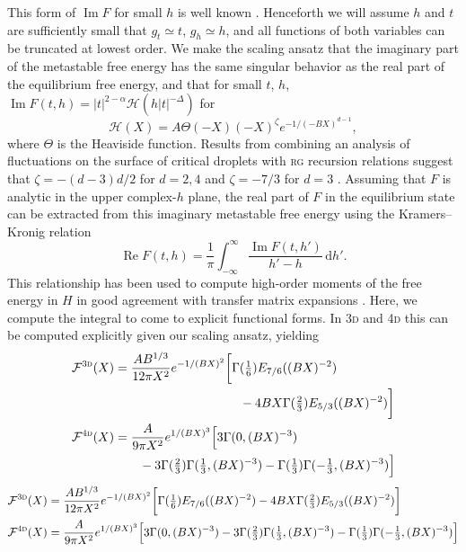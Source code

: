 \documentclass[aps,prl,reprint]{revtex4-1}
\def\[{\begin{equation}}
\def\]{\end{equation}}
\def\re{\mathop{\mathrm{Re}}\nolimits}
\def\im{\mathop{\mathrm{Im}}\nolimits}
\def\dd{\mathrm d}
\newif\ifreprint
\begin{document}
This form of $\im F$ for small $h$ is well known
\cite{langer.1967.condensation,harris.1984.metastability}. Henceforth we will
assume $h$ and $t$ are sufficiently small that $g_t\simeq t$, $g_h\simeq h$,
and all functions of both variables can be truncated at lowest order. We make
the scaling ansatz that the imaginary part of the metastable free energy has
the same singular behavior as the real part of the equilibrium free energy,
and that for small $t$, $h$, $\im F(t,h)=|t|^{2-\alpha}\mathcal
H(h|t|^{-\Delta})$ for
\[
  \mathcal H(X)=A\Theta(-X)(-X)^\zeta e^{-1/(-BX)^{d-1}},
  \label{eq:im.scaling}
\]
where $\Theta$ is the Heaviside function. Results from combining an analysis
of fluctuations on the surface of critical droplets with \textsc{rg} recursion
relations suggest that $\zeta=-(d-3)d/2$ for $d=2,4$ and $\zeta=-7/3$ for
$d=3$
\cite{houghton.1980.metastable,rudnick.1976.equations,gunther.1980.goldstone}.
Assuming that $F$ is analytic in the upper complex-$h$ plane, the real part of
$F$ in the equilibrium state can be extracted from this imaginary metastable
free energy using the Kramers--Kronig relation
\[
  \re F(t,h)=\frac1\pi\int_{-\infty}^\infty\frac{\im F(t,h')}{h'-h}\,\dd h'.
\]
This relationship has been used to compute high-order moments of the free
energy in $H$ in good agreement with transfer matrix expansions
\cite{lowe.1980.instantons}. Here, we compute the integral to come to explicit
functional forms.  In \textsc{3d} and \textsc{4d} this can be computed
explicitly given our scaling ansatz, yielding
\ifreprint
\begin{align}
  \mathcal F^{\text{\textsc{3d}}}(X)&=
  \frac{AB^{1/3}}{12\pi X^2}e^{-1/(BX)^2}
  \bigg[\Gamma(\tfrac16)E_{7/6}((BX)^{-2})\\
  &\hspace{10em}-4BX\Gamma(\tfrac23)E_{5/3}((BX)^{-2})\bigg]
  \notag
\\
  \mathcal F^{\text{\textsc{4d}}}(X)&=
  \frac{A}{9\pi X^2}e^{1/(BX)^3}
  \Big[3\Gamma(0,(BX)^{-3})\\
  &\hspace{2em}-3\Gamma(\tfrac23)\Gamma(\tfrac13,(BX)^{-3})
  -\Gamma(\tfrac13)\Gamma(-\tfrac13,(BX)^{-3})\Big]
  \notag
\end{align}
\else
\begin{align}
  \mathcal F^{\text{\textsc{3d}}}(X)&=
  \frac{AB^{1/3}}{12\pi X^2}e^{-1/(BX)^2}
  \bigg[\Gamma(\tfrac16)E_{7/6}((BX)^{-2})
  -4BX\Gamma(\tfrac23)E_{5/3}((BX)^{-2})\bigg]
\\
  \mathcal F^{\text{\textsc{4d}}}(X)&=
  \frac{A}{9\pi X^2}e^{1/(BX)^3}
  \Big[3\Gamma(0,(BX)^{-3})
  -3\Gamma(\tfrac23)\Gamma(\tfrac13,(BX)^{-3})
  -\Gamma(\tfrac13)\Gamma(-\tfrac13,(BX)^{-3})\Big]
\end{align}
\end{document}
